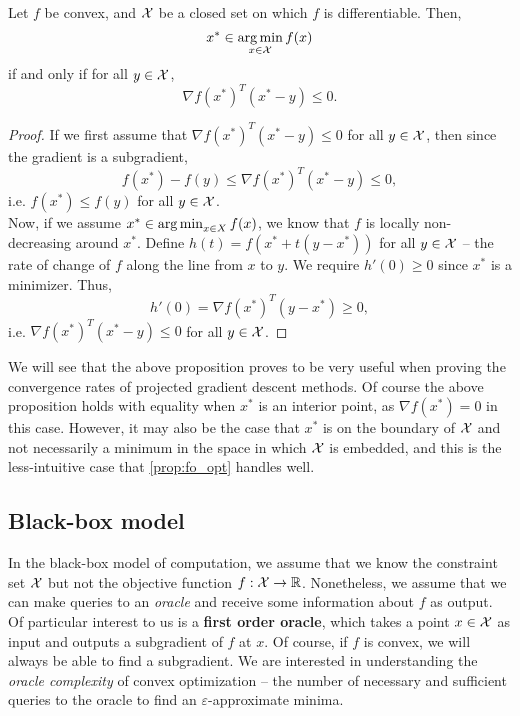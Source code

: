 \begin{proposition}\label{prop:fo_opt}
Let $f$ be convex, and $\mathcal{X}$ be a closed set on which $f$ is differentiable. Then,
\[
x^* \in \operatorname*{arg\,min}_{x \in \mathcal{X}} f(x)
\]
if and only if for all $y \in \mathcal{X}$,
\[
\nabla f(x^*)^T (x^* - y) \leq 0.
\]
\begin{proof}
If we first assume that $\nabla f(x^*)^T(x^* - y) \leq 0$ for all $y \in \mathcal{X}$, then since the gradient is a subgradient,
\[
f(x^*) - f(y) \leq \nabla f(x^*)^T (x^* - y) \leq 0,
\]
i.e. $f(x^*) \leq f(y)$ for all $y \in \mathcal{X}$. \\

Now, if we assume $x^* \in \operatorname*{arg\,min}_{x \in X}f(x)$, we know that $f$ is locally non-decreasing around $x^*$. Define $h(t) = f(x^* + t(y-x^*))$ for all $y \in \mathcal{X}$ -- the rate of change of $f$ along the line from $x$ to $y$. We require $h'(0) \geq 0$ since $x^*$ is a minimizer. Thus,
\[
h'(0) = \nabla f(x^*)^T (y - x^*) \geq 0, 
\]
i.e. $\nabla f(x^*)^T (x^* - y) \leq 0$ for all $y \in \mathcal{X}$. 
\end{proof}
\end{proposition}

We will see that the above proposition proves to be very useful when proving the convergence rates of projected gradient descent methods. Of course the above proposition holds with equality when $x^*$ is an interior point, as $\nabla f(x^*) = 0$ in this case. However, it may also be the case that $x^*$ is on the boundary of $\mathcal{X}$ and not necessarily a minimum in the space in which $\mathcal{X}$ is embedded, and this is the less-intuitive case that \autoref{prop:fo_opt} handles well.

\subsection{Black-box model}
In the black-box model of computation, we assume that we know the constraint set $\mathcal{X}$ but not the objective function $f : \mathcal{X} \rightarrow \mathbb{R}$. Nonetheless, we assume that we can make queries to an \emph{oracle} and receive some information about $f$ as output. Of particular interest to us is a \textbf{first order oracle}, which takes a point $x \in \mathcal{X}$ as input and outputs a subgradient of $f$ at $x$. Of course, if $f$ is convex, we will always be able to find a subgradient. We are interested in understanding the \emph{oracle complexity} of convex optimization -- the number of necessary and sufficient queries to the oracle to find an $\varepsilon$-approximate minima. 

